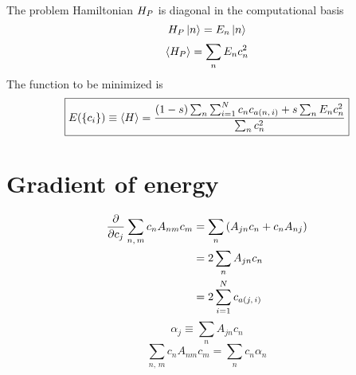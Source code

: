 The problem Hamiltonian $H_P$ is diagonal in the computational basis
\begin{equation}
  H_P \left| n \right> = E_n \left| n \right>
  \label{}
\end{equation}
\begin{equation}
  \left< H_P \right> = \sum_n E_n c_n^2
  \label{}
\end{equation}
The function to be minimized is
\begin{equation}
  \boxed{
  E( \{ c_i \})
  \equiv \left< H \right>
  = \frac{(1-s) \sum_n \sum_{i=1}^N c_n c_{a(n,\,i)} + s \sum_n E_n c_n^2}
  {\sum_n c_n^2}
  }
  \label{}
\end{equation}
\section*{Gradient of energy}
\begin{align}
  \frac{\partial }{\partial c_j} \sum_{n,\,m} c_n A_{n m} c_m
  &= \sum_n \left( A_{j n} c_n + c_n A_{n j} \right) \\
  &= 2 \sum_n A_{j n} c_n \\
  &= 2 \sum_{i=1}^N c_{a(j,\,i)}
  \label{}
\end{align}
\begin{equation}
  \alpha_j \equiv \sum_n A_{j n} c_n
  \label{}
\end{equation}
\begin{equation}
  \sum_{n,\,m} c_n A_{n m} c_m = \sum_n c_n \alpha_n
  \label{}
\end{equation}


